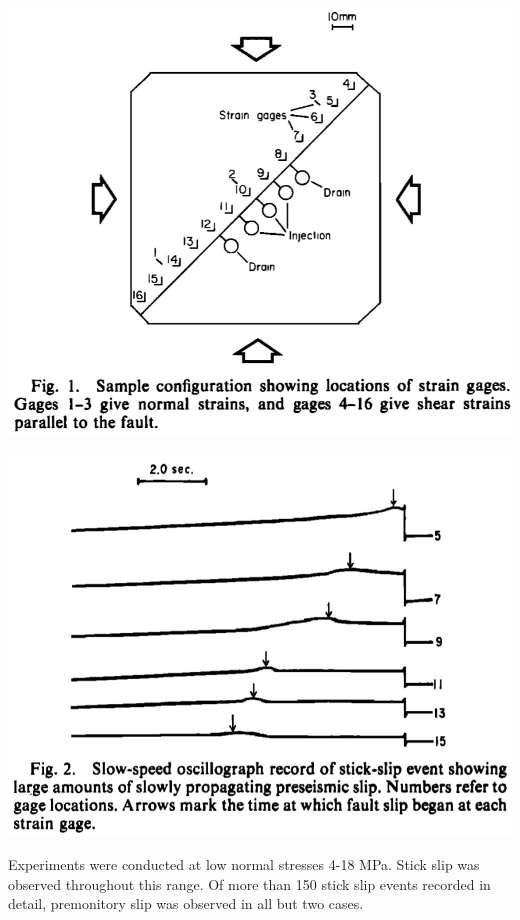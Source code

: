 \documentclass[aspectratio=43,9pt]{beamer}
\begin{document}
\begin{frame}{}

\begin{minipage}{0.45\linewidth}
  \includegraphics[width=1\linewidth]{Figs/figure_1.jpg}
\end{minipage}
\begin{minipage}{0.45\linewidth}
  \includegraphics[width=1\linewidth]{Figs/figure_2.jpg}
\end{minipage}

Experiments were conducted at low normal stresses 4-18 MPa. 
Stick slip was observed throughout this range. Of more than 150 stick slip 
events recorded in detail, premonitory slip was observed in all but two cases.


\end{frame}
\end{document}
